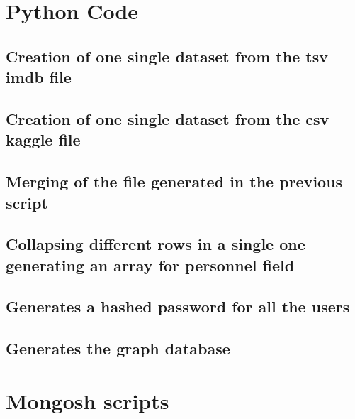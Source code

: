 

\justifying

\begin{alphasection}
\section{Python Code}\label{sec:pycode}
\subsection{Creation of one single dataset from the tsv imdb file}\label{subsec:datasetGeneratorImdb}


\subsection{Creation of one single dataset from the csv kaggle file}\label{subsec:datasetGeneratorRotten}


\subsection{Merging of the file generated in the previous script}\label{subsec:datasetMerge}


\subsection{Collapsing different rows in a single one generating an array for personnel field}\label{subsec:datasetPersonnelCollapse}


\subsection{Generates a hashed password for all the users}\label{subsec:createUserPassword}


\subsection{Generates the graph database}\label{subsec:createGraphDB}

\newpage
\section{Mongosh scripts}

\end{alphasection}
